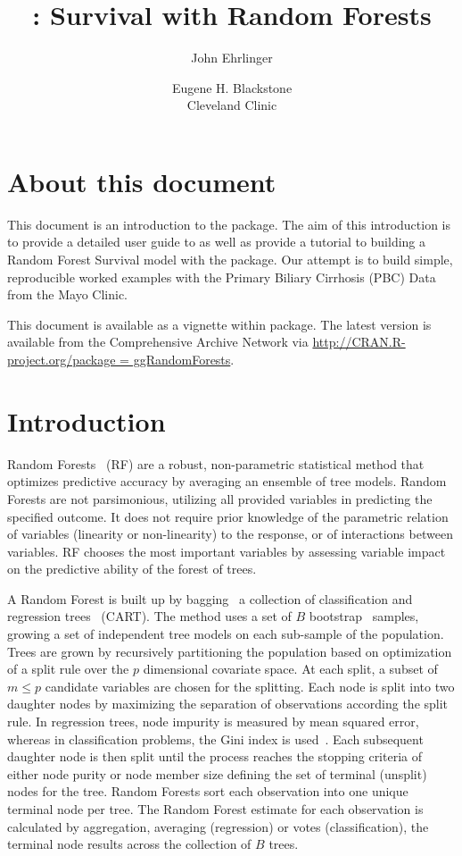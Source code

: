 \documentclass[nojss]{jss}
\author{John Ehrlinger 
\and Eugene H. Blackstone\\Cleveland Clinic}
\title{\pkg{ggRandomForests}: Survival with Random Forests}
\begin{document}
\section{About this document}
This document is an introduction to the   package. The aim of this introduction is to provide a detailed user guide to  as well as provide a tutorial to building a Random Forest Survival model with the  package. Our attempt is to build simple, reproducible worked examples with the Primary Biliary Cirrhosis (PBC) Data from the Mayo Clinic.

This document is available as a vignette within  package. The latest version is available from the Comprehensive  Archive Network via \url{http://CRAN.R-project.org/package = ggRandomForests}.

\section{Introduction} \label{S:introduction}

Random Forests~\citep{Breiman:2001} (RF) are a robust, non-parametric statistical method that optimizes predictive accuracy by averaging an ensemble of tree models. Random Forests are not parsimonious, utilizing all provided variables in predicting the specified outcome. It does not require prior knowledge of the parametric relation of variables (linearity or non-linearity) to the response, or of interactions between variables. RF chooses the most important variables by assessing variable impact on the predictive ability of the forest of trees.

A Random Forest is built up by bagging~\citep{Breiman:1996} a collection of classification and regression trees~\citep{cart:1984} (CART). The method uses a set of $B$ bootstrap~\citep{bootstrap:1994} samples, growing a set of independent tree models on each sub-sample of the population. Trees are grown by recursively partitioning the population based on optimization of a split rule over the $p$ dimensional covariate space. At each split, a subset of $m \le p$ candidate variables are chosen for the splitting. Each node is split into two daughter nodes by maximizing the separation of observations according the split rule. In regression trees, node impurity is measured by mean squared error, whereas in classification problems, the Gini index is used~\citep{Friedman:2000}. Each subsequent daughter node is then split until the process reaches the stopping criteria of either node purity or node member size defining the set of terminal (unsplit) nodes for the tree. Random Forests sort each observation into one unique terminal node per tree. The Random Forest estimate for each observation is calculated by aggregation, averaging (regression) or votes (classification), the terminal node results across the collection of $B$ trees. 
\end{document}
